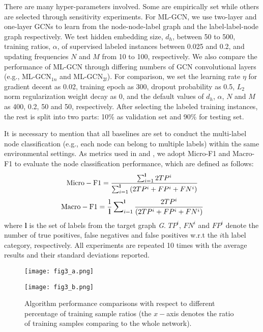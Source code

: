 \documentclass[conference]{IEEEtran}
\begin{document}
There are many hyper-parameters involved. Some are empirically set \cite{25} while others are selected through sensitivity experiments. For ML-GCN, we use two-layer and one-layer GCNs to learn from the node-node-label graph and the label-label-node graph respectively. We test hidden embedding size, $d_h$, between 50 to 500, training ratios, $\alpha$, of supervised labeled instances between 0.025 and 0.2, and updating frequencies $N$ and $M$ from 10 to 100, respectively. We also compare the performance of ML-GCN through differing numbers of GCN convolutional layers (e.g., ML-GCN$_{1n}$ and ML-GCN$_{2l}$). For comparison, we set the learning rate $\eta$ for gradient decent as 0.02, training epoch as 300, dropout probability as 0.5, $L_2$ norm regularization weight decay as 0, and the default values of $d_h$, $\alpha$, $N$ and $M$ as 400, 0.2, 50 and 50, respectively. After selecting the labeled training instances, the rest is split into two parts: 10\% as validation set and 90\% for testing set.

It is necessary to mention that all baselines are set to conduct the multi-label node classification (e.g., each node can belong to multiple labels) within the same environmental settings. As metrics used in \cite{21} and \cite{23}, we adopt Micro-F1 and Macro-F1 to evaluate the node classification performance, which are defined as follows:
\begin{equation}
{\rm Micro-F1} = \frac{{\sum\nolimits_{i = 1}^\mathbf{l} {2TP^i } }}{{\sum\nolimits_{i = 1}^\mathbf{l} {(2TP^i  + FP^i  + FN^i )} }}
\end{equation}
\begin{equation}
{\rm Macro-F1} = \frac{1}{\mathbf{l}}\sum\nolimits_{i = 1}^\mathbf{l} {\frac{{2TP^i }}{{\left( {2TP^i  + FP^i  + FN^i } \right)}}}
\end{equation}
where $\mathbf{l}$ is the set of labels from the target graph \textit{G}. $TP^i$, $FN^i$ and $FP^i$ denote the number of true positives, false negatives and false positives w.r.t the $i$th label category, respectively. All experiments are repeated 10 times with the average results and their standard deviations reported.

\begin{figure*}[t]
\centering
\begin{minipage}[b]{0.33\linewidth}
\centering 
\texttt{[image: fig3\_a.png]}
\end{minipage}\hspace{10mm}
\begin{minipage}[b]{0.33\linewidth}
\centering 
\texttt{[image: fig3\_b.png]}
\end{minipage}\caption{Algorithm performance comparisons with respect to different percentage of training sample ratios (the $x-$axis denotes the ratio of training samples comparing to the whole network).}
\end{figure*} 
\end{document}
